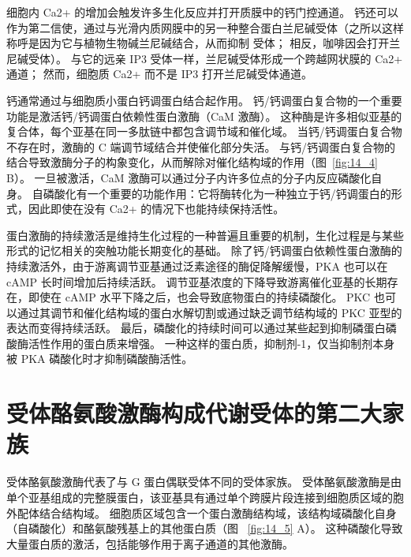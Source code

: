 细胞内 Ca2+ 的增加会触发许多生化反应并打开质膜中的钙门控通道。
钙还可以作为第二信使，通过与光滑内质网膜中的另一种整合蛋白兰尼碱受体（之所以这样称呼是因为它与植物生物碱兰尼碱结合，从而抑制 受体；
相反，咖啡因会打开兰尼碱受体）。
与它的远亲 IP3 受体一样，兰尼碱受体形成一个跨越网状膜的 Ca2+ 通道；
然而，细胞质 Ca2+ 而不是 IP3 打开兰尼碱受体通道。


钙通常通过与细胞质小蛋白钙调蛋白结合起作用。
钙/钙调蛋白复合物的一个重要功能是激活钙/钙调蛋白依赖性蛋白激酶（CaM 激酶）。
这种酶是许多相似亚基的复合体，每个亚基在同一多肽链中都包含调节域和催化域。
当钙/钙调蛋白复合物不存在时，激酶的 C 端调节域结合并使催化部分失活。
与钙/钙调蛋白复合物的结合导致激酶分子的构象变化，从而解除对催化结构域的作用（图~\ref{fig:14_4} B）。
一旦被激活，CaM 激酶可以通过分子内许多位点的分子内反应磷酸化自身。
自磷酸化有一个重要的功能作用：它将酶转化为一种独立于钙/钙调蛋白的形式，因此即使在没有 Ca2+ 的情况下也能持续保持活性。


蛋白激酶的持续激活是维持生化过程的一种普遍且重要的机制，生化过程是与某些形式的记忆相关的突触功能长期变化的基础。
除了钙/钙调蛋白依赖性蛋白激酶的持续激活外，由于游离调节亚基通过泛素途径的酶促降解缓慢，PKA 也可以在 cAMP 长时间增加后持续活跃。
调节亚基浓度的下降导致游离催化亚基的长期存在，即使在 cAMP 水平下降之后，也会导致底物蛋白的持续磷酸化。
PKC 也可以通过其调节和催化结构域的蛋白水解切割或通过缺乏调节结构域的 PKC 亚型的表达而变得持续活跃。
最后，磷酸化的持续时间可以通过某些起到抑制磷蛋白磷酸酶活性作用的蛋白质来增强。
一种这样的蛋白质，抑制剂-1，仅当抑制剂本身被 PKA 磷酸化时才抑制磷酸酶活性。



\section{受体酪氨酸激酶构成代谢受体的第二大家族}

受体酪氨酸激酶代表了与 G 蛋白偶联受体不同的受体家族。
受体酪氨酸激酶是由单个亚基组成的完整膜蛋白，该亚基具有通过单个跨膜片段连接到细胞质区域的胞外配体结合结构域。
细胞质区域包含一个蛋白激酶结构域，该结构域磷酸化自身（自磷酸化）和酪氨酸残基上的其他蛋白质（图 ~\ref{fig:14_5} A）。
这种磷酸化导致大量蛋白质的激活，包括能够作用于离子通道的其他激酶。


